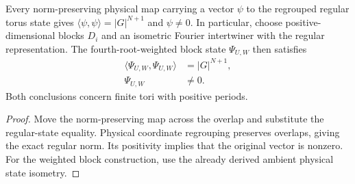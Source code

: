\begin{lemma}%
    \label{thm:peps_weighted_torus_norm}
    \leanok
    Every norm-preserving physical map carrying a vector $\psi$ to the
    regrouped regular torus state gives
    $\langle\psi,\psi\rangle=|G|^{N+1}$ and $\psi\ne0$.
    In particular, choose positive-dimensional blocks $D_i$ and an
    isometric Fourier intertwiner with the regular representation.
    The fourth-root-weighted block state $\Psi_{U,W}$ then satisfies
    \begin{align}
        \langle\Psi_{U,W},\Psi_{U,W}\rangle
                   & =|G|^{N+1}, \\
        \Psi_{U,W} & \ne0.
    \end{align}
    Both conclusions concern finite tori with positive periods.
\end{lemma}
\begin{proof}\leanok
    Move the norm-preserving map across the overlap and substitute the
    regular-state equality. Physical coordinate regrouping preserves
    overlaps, giving the exact regular norm. Its positivity implies that
    the original vector is nonzero. For the weighted block construction,
    use the already derived ambient physical state isometry.
\end{proof}
